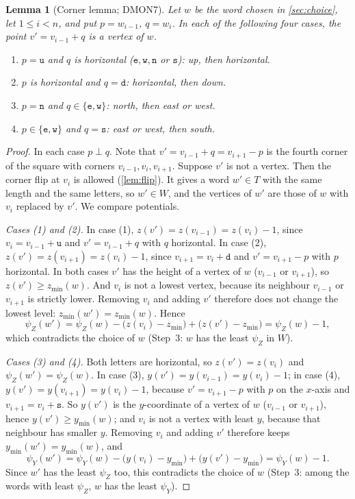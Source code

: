 \documentclass[11pt]{article}
\theoremstyle{plain}
\newtheorem{lemma}[theorem]{Lemma}
\theoremstyle{definition}
\theoremstyle{remark}
\newcommand{\word}[1]{\texttt{#1}}
\newcommand{\dmon}[1]{\textup{DMON#1}}
\newcommand{\psiZ}{\psi_Z}
\newcommand{\psiY}{\psi_Y}
\begin{document}
\begin{lemma}[Corner lemma; \dmon7]\label{lem:corner}
Let $w$ be the word chosen in \cref{sec:choice}, let $1\le i<n$, and put $p=w_{i-1}$, $q=w_i$. In each
of the following four cases, the point $v'=v_{i-1}+q$ is a vertex of $w$.
\begin{enumerate}[label=(\arabic*)]
\item $p=\word{u}$ and $q$ is horizontal ($\word{e},\word{w},\word{n}$ or $\word{s}$): up, then horizontal.
\item $p$ is horizontal and $q=\word{d}$: horizontal, then down.
\item $p=\word{n}$ and $q\in\{\word{e},\word{w}\}$: north, then east or west.
\item $p\in\{\word{e},\word{w}\}$ and $q=\word{s}$: east or west, then south.
\end{enumerate}
\end{lemma}
\begin{proof}
In each case $p\perp q$. Note that $v'=v_{i-1}+q=v_{i+1}-p$ is the fourth corner of the square with
corners $v_{i-1},v_i,v_{i+1}$. Suppose $v'$ is not a vertex. Then the corner flip at $v_i$ is allowed
(\cref{lem:flip}). It gives a word $w'\in T$ with the same length and the same letters, so
$w'\in W$, and the vertices of $w'$ are those of $w$ with $v_i$ replaced by $v'$. We compare
potentials.

\emph{Cases (1) and (2).} In case (1), $z(v')=z(v_{i-1})=z(v_i)-1$, since $v_i=v_{i-1}+\word{u}$ and
$v'=v_{i-1}+q$ with $q$ horizontal. In case (2), $z(v')=z(v_{i+1})=z(v_i)-1$, since
$v_{i+1}=v_i+\word{d}$ and $v'=v_{i+1}-p$ with $p$ horizontal. In both cases $v'$ has the height of a
vertex of $w$ ($v_{i-1}$ or $v_{i+1}$), so $z(v')\ge z_{\min}(w)$. And $v_i$ is not a lowest
vertex, because its neighbour $v_{i-1}$ or $v_{i+1}$ is strictly lower. Removing $v_i$ and adding $v'$ therefore
does not change the lowest level: $z_{\min}(w')=z_{\min}(w)$. Hence
\[ \psiZ(w')=\psiZ(w)-\bigl(z(v_i)-z_{\min}\bigr)+\bigl(z(v')-z_{\min}\bigr)=\psiZ(w)-1, \]
which contradicts the choice of $w$ (Step~3: $w$ has the least $\psiZ$ in $W$).

\emph{Cases (3) and (4).} Both letters are horizontal, so $z(v')=z(v_i)$ and $\psiZ(w')=\psiZ(w)$. In
case (3), $y(v')=y(v_{i-1})=y(v_i)-1$; in case (4), $y(v')=y(v_{i+1})=y(v_i)-1$, because $v'=v_{i+1}-p$
with $p$ on the $x$-axis and $v_{i+1}=v_i+\word{s}$. So $y(v')$ is the $y$-coordinate of a vertex of $w$ ($v_{i-1}$ or $v_{i+1}$), hence $y(v')\ge y_{\min}(w)$; and $v_i$ is not a vertex with least $y$, because that neighbour has smaller $y$. Removing $v_i$ and adding $v'$ therefore keeps $y_{\min}(w')=y_{\min}(w)$, and
\[ \psiY(w')=\psiY(w)-\bigl(y(v_i)-y_{\min}\bigr)+\bigl(y(v')-y_{\min}\bigr)=\psiY(w)-1. \]
 Since
$w'$ has the least $\psiZ$ too, this contradicts the choice of $w$ (Step~3: among the words with least
$\psiZ$, $w$ has the least $\psiY$).
\end{proof}
\end{document}
